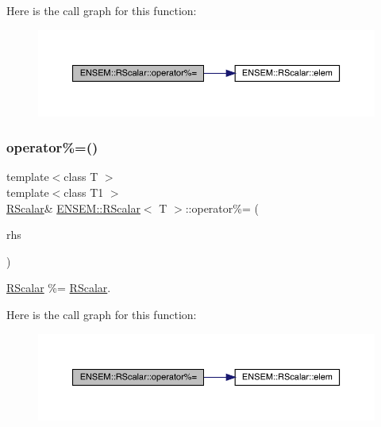 Here is the call graph for this function\+:
\nopagebreak
\begin{figure}[H]
\begin{center}
\leavevmode
\includegraphics[width=350pt]{d0/d8c/classENSEM_1_1RScalar_ac5ab25042d679a621ccb42d13fb3b441_cgraph}
\end{center}
\end{figure}
\mbox{\label{classENSEM_1_1RScalar_ac5ab25042d679a621ccb42d13fb3b441}} 
\subsubsection{\texorpdfstring{operator\%=()}{operator\%=()}\hspace{0.1cm}{\footnotesize\ttfamily [3/3]}}
{\footnotesize\ttfamily template$<$class T $>$ \\
template$<$class T1 $>$ \\
\mbox{\hyperlink{classENSEM_1_1RScalar}{R\+Scalar}}\& \mbox{\hyperlink{classENSEM_1_1RScalar}{E\+N\+S\+E\+M\+::\+R\+Scalar}}$<$ T $>$\+::operator\%= (\begin{DoxyParamCaption}\item[{const \mbox{\hyperlink{classENSEM_1_1RScalar}{R\+Scalar}}$<$ T1 $>$ \&}]{rhs }\end{DoxyParamCaption})\hspace{0.3cm}{\ttfamily [inline]}}



\mbox{\hyperlink{classENSEM_1_1RScalar}{R\+Scalar}} \%= \mbox{\hyperlink{classENSEM_1_1RScalar}{R\+Scalar}}. 

Here is the call graph for this function\+:
\nopagebreak
\begin{figure}[H]
\begin{center}
\leavevmode
\includegraphics[width=350pt]{d0/d8c/classENSEM_1_1RScalar_ac5ab25042d679a621ccb42d13fb3b441_cgraph}
\end{center}
\end{figure}
\mbox{\label{classENSEM_1_1RScalar_aa091ededdea0fc13deb359321f213780}} 

